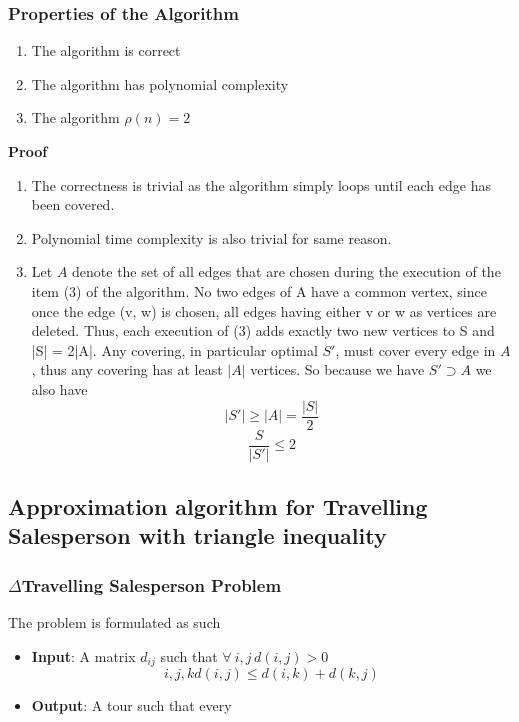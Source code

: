 \documentclass{article}
\theoremstyle{definition}
\begin{document}
\subsubsection{Properties of the Algorithm}
\begin{enumerate}
    \item The algorithm is correct
    \item The algorithm has polynomial complexity
    \item The algorithm $\rho(n) = 2$
\end{enumerate}
\textbf{Proof}
\begin{enumerate}
    \item
        The correctness is trivial
        as the algorithm simply loops until each edge has been covered.
    \item
        Polynomial time complexity is also trivial for same reason.
    \item
        Let $A$ denote the set of all edges that are chosen during the execution of the item (3) of the algorithm.
        No two edges of A have a common vertex, since once the edge (v, w) is chosen, all edges having either v or w as vertices are deleted.
        Thus, each execution of (3) adds exactly two new vertices to S and |S| = 2|A|.
        Any covering, in particular optimal $S\prime$, must cover every edge in $A$, thus any covering has at least $|A|$ vertices.
        So because we have $S\prime \supset A$ we also have
        $$|S\prime| \geq |A| = \frac{|S|}{2}$$
        $$\frac{S}{|S\prime|} \leq 2$$
\end{enumerate}

\subsection{Approximation algorithm for Travelling Salesperson with triangle inequality}
\subsubsection{$\Delta$Travelling Salesperson Problem}
The problem is formulated as such
\begin{itemize}
    \item \textbf{Input}:
        A matrix $d_{ij}$ such that $\forall\ i,j\, d(i,j) > 0$
        $$
        i,j,k d(i,j) \leq d(i,k) + d(k,j)
        $$
    \item \textbf{Output}:
        A tour such that every 
\end{itemize}
\end{document}
